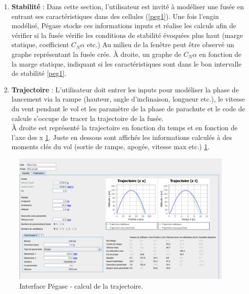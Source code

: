 \documentclass[a4paper]{article}
\begin{document}
\begin{enumerate}
\item \textbf{Stabilité} : Dans cette section, l'utilisateur est invité à modéliser une fusée en entrant ses caractéristiques dans des cellules (\ref{peg1}). Une fois l'engin modélisé, Pégase stocke ces informations inputs et réalise les calculs afin de vérifier si la fusée vérifie les conditions de stabilité évoquées plus haut (marge statique, coefficient $C_{N}\alpha$ etc.) Au milieu de la fenêtre peut être observé un graphe représentant la fusée crée. À droite, un graphe de $C_{N}\alpha$ en fonction de la marge statique, indiquant si les caractéristiques sont dans le bon intervalle de stabilité \ref{peg1}.

\item \textbf{Trajectoire} : L'utilisateur doit entrer les inputs pour modéliser la phase de lancement via la rampe (hauteur, angle d'inclinaison, longueur etc.), le vitesse du vent pendant le vol  et les paramètre de la phase de parachute et le code de calcule s'occupe de tracer la trajectoire de la fusée.\\

À droite est représenté la trajectoire en fonction du temps et en fonction de l'axe des x \ref{peg2}. Juste en dessous sont affichés les informations calculés à des moments clés du vol (sortie de rampe, apogée, vitesse max etc.) \ref{peg2}.

\end{enumerate}


\begin{figure}[!htbp]
\begin{center}
\includegraphics[width=11cm]{pictures/pegase2.PNG} 
\end{center}
\caption{Interface Pégase - calcul de la trajectoire.}
\label{peg2}
\end{figure}
\end{document}
